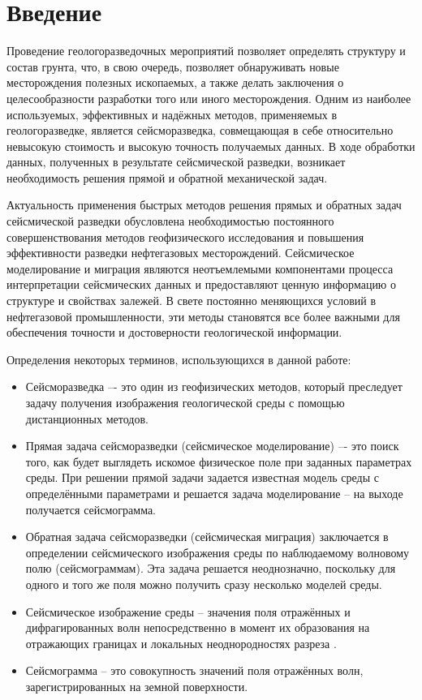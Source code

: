 \documentclass[a4paper, fontsize=14pt]{article}
\begin{document}
 
	
	\newpage 	
	\tableofcontents
	\newpage
	\section*{Введение} 
	
	Проведение геологоразведочных мероприятий позволяет определять структуру
	и состав грунта, что, в свою очередь, позволяет обнаруживать новые
	месторождения полезных ископаемых, а также делать заключения о
	целесообразности разработки того или иного месторождения.
	Одним из наиболее используемых, эффективных и надёжных методов,
	применяемых в геологоразведке, является сейсморазведка, совмещающая в себе
	относительно невысокую стоимость и высокую точность получаемых данных.  
	В ходе обработки данных, полученных в результате сейсмической разведки, 
	возникает необходимость решения прямой и обратной механической задач.
	
	Актуальность применения быстрых методов решения прямых и обратных задач сейсмической разведки обусловлена необходимостью постоянного совершенствования методов геофизического исследования и повышения эффективности разведки нефтегазовых месторождений. Сейсмическое моделирование и миграция являются неотъемлемыми компонентами процесса интерпретации сейсмических данных и предоставляют ценную информацию о структуре и свойствах залежей. В свете постоянно меняющихся условий в нефтегазовой промышленности, эти методы становятся все более важными для обеспечения точности и достоверности геологической информации.
	
	Определения некоторых терминов, использующихся в данной работе:
	\begin{itemize}
		\item Сейсморазведка –- это один из геофизических методов, который преследует задачу
		получения изображения геологической среды с помощью дистанционных методов. 
		
		\item Прямая задача сейсморазведки (сейсмическое моделирование) –- это поиск того, как будет выглядеть 
		искомое физическое поле при заданных параметрах среды. При решении прямой задачи 
		задается известная модель среды с определёнными параметрами и решается задача
		моделирование – на выходе получается сейсмограмма.
		
		\item Обратная задача сейсморазведки (сейсмическая миграция) заключается в определении сейсмического изображения среды по
		наблюдаемому волновому полю (сейсмограммам). Эта задача решается неоднозначно,
		поскольку для одного и того же поля можно получить сразу несколько моделей среды.
		
		\item Сейсмическое изображение среды --  значения поля 	отражённых и дифрагированных волн непосредственно в момент их образования на отражающих границах и локальных неоднородностях	разреза \cite{timoshin}.
		
		\item Сейсмограмма -- это совокупность значений поля отражённых волн, зарегистрированных на земной поверхности.   
	\end{itemize}
\end{document}
